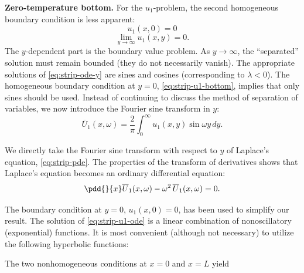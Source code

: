 \textbf{Zero-temperature bottom.}  For the $u_1$-problem, the second homogeneous boundary condition is less apparent:
\begin{equation}
\label{eq:strip-u1-bottom}
u_1(x,0) = 0
\end{equation}
\begin{equation}
\label{eq:strip-u1-decay}
\lim_{y\to\infty}u_1(x,y) = 0.
\end{equation}
The $y$-dependent part is the boundary value problem.  As $y \to \infty$, the ``separated'' solution must remain bounded (they do not necessarily vanish).  The appropriate solutions of \eqref{eq:strip-ode-y} are sines and cosines (corresponding to $\lambda < 0$).  The homogeneous boundary condition at $y = 0$, \eqref{eq:strip-u1-bottom}, implies that only sines should be used.  Instead of continuing to discuss the method of separation of variables, we now introduce the Fourier sine transform in $y$:
\begin{equation}
\label{eq:strip-u1-st-def}
\overline{U}_1(x,\omega) = \frac{2}{\pi}\int_0^{\infty}u_1(x,y)\sin\omega y\,dy.
\end{equation}

We directly take the Fourier sine transform with respect to $y$ of Laplace's equation, \eqref{eq:strip-pde}.  The properties of the transform of derivatives shows that Laplace's equation becomes an ordinary differential equation:
\begin{equation}
\label{eq:strip-u1-ode}
\pdd{}{x}\overline{U}_1(x,\omega) - \omega^2\,\overline{U}_1(x,\omega) = 0.
\end{equation}

The boundary condition at $y = 0$, $u_1(x,0) = 0$, has been used to simplify our result.  The solution of \eqref{eq:strip-u1-ode} is a linear combination of nonoscillatory (exponential) functions.  It is most convenient (although not necessary) to utilize the following hyperbolic functions:

The two nonhomogeneous conditions at $x = 0$ and $x = L$ yield

